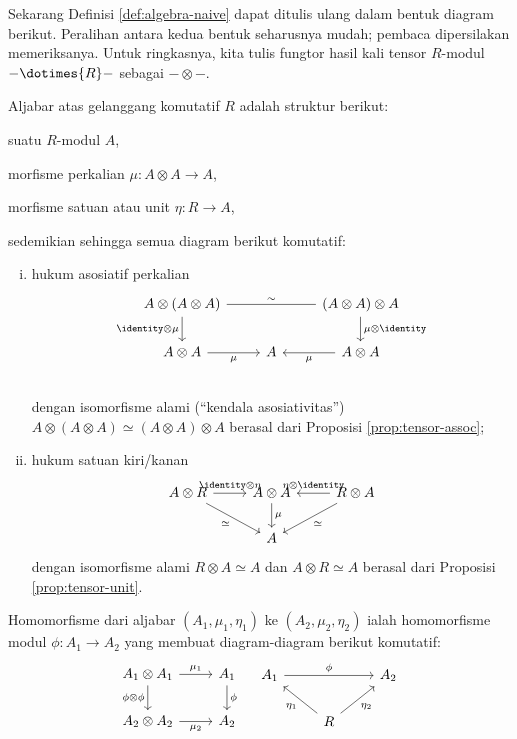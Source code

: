 Sekarang Definisi \ref{def:algebra-naive} dapat ditulis ulang dalam bentuk diagram berikut. Peralihan antara kedua bentuk seharusnya mudah; pembaca dipersilakan memeriksanya. Untuk ringkasnya, kita tulis fungtor hasil kali tensor $R$-modul $- \dotimes{R} -$ sebagai $- \otimes -$.
\begin{definition}\label{def:algebra-mod-diagram}
	Aljabar atas gelanggang komutatif $R$ adalah struktur berikut:
	\begin{compactitem}
		\item suatu $R$-modul $A$,
		\item morfisme perkalian $\mu: A \otimes A \to A$,
		\item morfisme satuan atau unit $\eta: R \to A$,
	\end{compactitem}
	sedemikian sehingga semua diagram berikut komutatif:
	\begin{enumerate}[(i)]
		\item hukum asosiatif perkalian
		\[\begin{tikzcd}
		A \otimes (A \otimes A) \arrow[dash, rr, "\sim"] \arrow[d, "\identity \otimes \mu"'] & & (A \otimes A) \otimes A \arrow[d, "\mu \otimes \identity"] \\
		A \otimes A \arrow[r, "\mu"'] & A & A \otimes A \arrow[l, "\mu"] \\
		\end{tikzcd}\]
		dengan isomorfisme alami (``kendala asosiativitas'') $A \otimes (A \otimes A) \simeq (A \otimes A) \otimes A$ berasal dari Proposisi \ref{prop:tensor-assoc};
		\item hukum satuan kiri/kanan
		\[\begin{tikzcd}
		A \otimes R \arrow[r, "\identity \otimes \eta"] \arrow[rd, "\simeq"'] & A \otimes A \arrow[d, "\mu"] & R \otimes A \arrow[l, "\eta \otimes \identity"'] \arrow[ld, "\simeq"] \\
		& A &
		\end{tikzcd} \]
		dengan isomorfisme alami $R \otimes A \simeq A$ dan $A \otimes R \simeq A$ berasal dari Proposisi \ref{prop:tensor-unit}.
	\end{enumerate}
	Homomorfisme dari aljabar $(A_1, \mu_1, \eta_1)$ ke $(A_2, \mu_2, \eta_2)$ ialah homomorfisme modul $\phi: A_1 \to A_2$ yang membuat diagram-diagram berikut komutatif:
	\[\begin{tikzcd}
		A_1 \otimes A_1 \arrow[r, "\mu_1"] \arrow[d, "\phi \otimes \phi"'] & A_1 \arrow[d, "\phi"] \\
		A_2 \otimes A_2 \arrow[r, "\mu_2"'] & A_2
	\end{tikzcd}\quad\begin{tikzcd}
		A_1 \arrow[rr, "\phi"] & & A_2 \\
		& R \arrow[lu, "\eta_1"] \arrow[ru, "\eta_2"'] &
	\end{tikzcd}\]
\end{definition}
